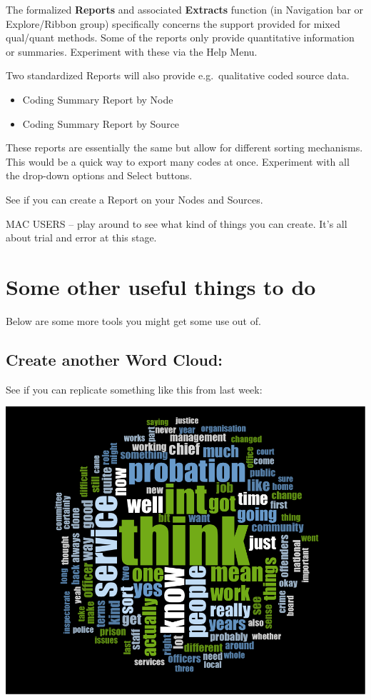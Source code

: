 \documentclass[]{book}
\providecommand{\tightlist}{%
  \setlength{\itemsep}{0pt}\setlength{\parskip}{0pt}}
\theoremstyle{definition}
\theoremstyle{definition}
\theoremstyle{definition}
\theoremstyle{remark}
\begin{document}
The formalized \textbf{Reports} and associated \textbf{Extracts}
function (in Navigation bar or Explore/Ribbon group) specifically
concerns the support provided for mixed qual/quant methods. Some of the
reports only provide quantitative information or summaries. Experiment
with these via the Help Menu.

Two standardized Reports will also provide e.g.~qualitative coded source
data.

\begin{itemize}
\tightlist
\item
  Coding Summary Report by Node
\item
  Coding Summary Report by Source
\end{itemize}

These reports are essentially the same but allow for different sorting
mechanisms. This would be a quick way to export many codes at once.
Experiment with all the drop-down options and Select buttons.

See if you can create a Report on your Nodes and Sources.

MAC USERS -- play around to see what kind of things you can create. It's
all about trial and error at this stage.

\hypertarget{some-other-useful-things-to-do}{%
\section{Some other useful things to
do}\label{some-other-useful-things-to-do}}

Below are some more tools you might get some use out of.

\hypertarget{create-another-word-cloud}{%
\subsection{Create another Word
Cloud:}\label{create-another-word-cloud}}

See if you can replicate something like this from last week:

\includegraphics{imgs/qual_54.png}
\end{document}
